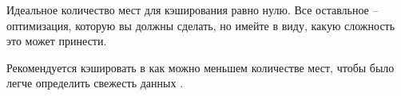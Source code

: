 \documentclass[%
	11pt,
	a4paper,
	utf8,
		]{article}
\begin{document}
Идеальное количество мест для кэширования равно нулю. Все оставльное -- оптимизация, которую вы должны сделать, но имейте в виду, какую сложность это может принести.

Рекомендуется кэшировать в как можно меньшем количестве мест, чтобы было легче определить свежесть данных \cite[]{microservices-2024}.










\begin{thebibliography}{99}
	
	
\end{thebibliography}


\end{document}
